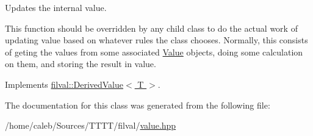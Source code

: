 Updates the internal value. 

This function should be overridden by any child class to do the actual work of updating value based on whatever rules the class chooses. Normally, this consists of geting the values from some associated \hyperlink{classfilval_1_1Value}{Value} objects, doing some calculation on them, and storing the result in value. 

Implements \hyperlink{classfilval_1_1DerivedValue_a74e04450a550454510329a9e6b941304}{filval\+::\+Derived\+Value$<$ T $>$}.



The documentation for this class was generated from the following file\+:\begin{DoxyCompactItemize}
\item 
/home/caleb/\+Sources/\+T\+T\+T\+T/filval/\hyperlink{value_8hpp}{value.\+hpp}\end{DoxyCompactItemize}
